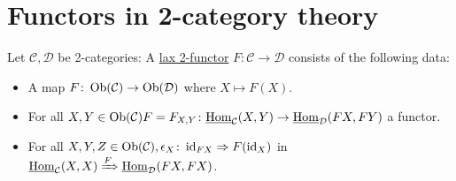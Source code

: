 \section{Functors in 2-category theory}

\begin{defi}
	Let $ \mathcal{ C } , \mathcal{ D } $ be 2-categories:
	A \underline{lax 2-functor} $ F \colon \mathcal{ C } \to \mathcal{ D } $ consists of the following data:
	\begin{itemize}
		\item 
		A map $ F \colon \operatorname{Ob} ( \mathcal{ C } ) \to \operatorname{Ob} ( \mathcal{ D } ) $ where $ X \mapsto F ( X ) $.
		
		\item 
		For all $  X , Y \in \operatorname{Ob} ( \mathcal{ C } ) F = F_{ X , Y } \colon \underline{\operatorname{Hom}}_{ \mathcal{ C } } ( X , Y ) \to \underline{\operatorname{Hom}}_{ \mathcal{ D } } ( FX , FY ) $ a functor.
		
		\item 
		For all $ X , Y , Z \in \operatorname{Ob}( \mathcal{ C } ), \epsilon_X \colon \operatorname{id}_{ FX } \Rightarrow F ( \operatorname{id}_X ) $ in $ \underline{\operatorname{Hom}}_{ \mathcal{ C } } ( X , X ) \xRightarrow{ F} \underline{ \operatorname{Hom} }_{ \mathcal{ D } } ( F X , FX )$.
		

\end{itemize}
\end{defi}
